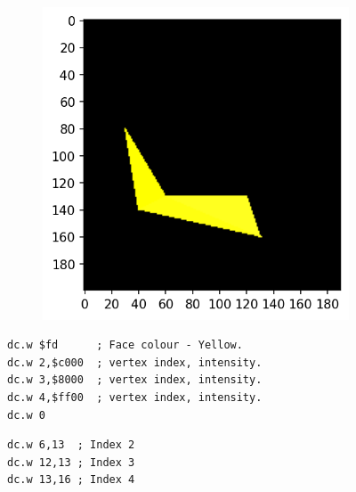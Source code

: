 \begin{figure}[H]
  \centering
  \begin{adjustbox}{width=13cm,center}
    \begin{minipage}[c]{0.48\linewidth}
      \begin{figure}[H]
        \centering
        \begin{adjustbox}{width=5.5cm,center}
          \includegraphics[width=12cm]{src/build_t2k_claws/claw_face_3.png}%
        \end{adjustbox}
      \end{figure}
    \end{minipage}
    \begin{minipage}[c]{0.48\linewidth}
      \begin{lstlisting}[basicstyle=\scriptsize\ttfamily]
dc.w $fd      ; Face colour - Yellow.
dc.w 2,$c000  ; vertex index, intensity.
dc.w 3,$8000  ; vertex index, intensity.
dc.w 4,$ff00  ; vertex index, intensity.
dc.w 0
      \end{lstlisting}
      \begin{lstlisting}[basicstyle=\scriptsize\ttfamily]
dc.w 6,13  ; Index 2
dc.w 12,13 ; Index 3
dc.w 13,16 ; Index 4
      \end{lstlisting}
      \vspace*{\fill}
    \end{minipage}
  \end{adjustbox}
\end{figure}

